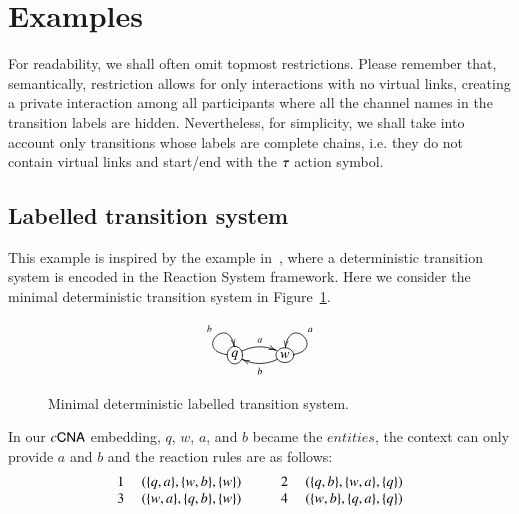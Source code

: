 \section{Examples}
\label{ex:examples}
{\color{red} For readability,  we shall often omit topmost restrictions. Please remember that, semantically, restriction allows for only interactions with no virtual links, creating a private interaction among all participants where all the channel names in the transition labels are hidden.
 Nevertheless, for simplicity,
 we shall take into account only transitions whose labels are complete chains, i.e. they do not contain 
virtual links and start/end with the $\tau$ action symbol.}



\subsection{Labelled transition system}
This example is inspired by the example in~\cite{BEMR11}, where
a deterministic transition system is 
{\color{red} encoded} in the Reaction System
framework.
Here we consider the minimal deterministic transition system in Figure~\ref{fig:lts}.
\begin{figure}
\[
\xymatrix{
*+[o][F-]{q} \ar@/ ^/[r]^a \ar@(l,u)[]^b &
*+[o][F-]{w} \ar@/^/[l]^b \ar@(r,u)[]_a
}
\]
\caption{Minimal deterministic labelled transition system.}
\label{fig:lts}
\end{figure}
\noindent
In our $c\textsf{CNA}$ 
{\color{red} embedding,} $q$, $w$, $a$, and $b$ became the $entities$, the context can only provide $a$ and $b$ and the reaction rules are as follows:\\
\[
\begin{array}{cl@{\hspace{1cm}} cl}
1 \ &(\{q,a\},\{w,b\},\{w\}) & 2\ &(\{q,b\},\{w,a\},\{q\})\\
3 \  &(\{w,a\},\{q,b\},\{w\}) & 4\ &(\{w,b\},\{q,a\},\{q\})\\ 
\end{array}
\]
